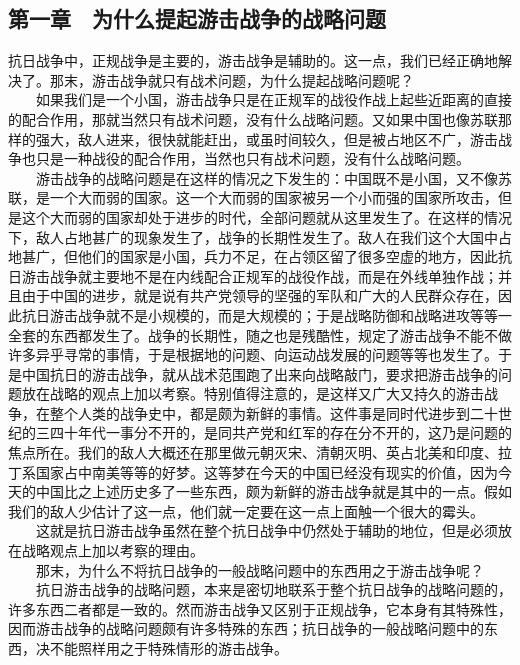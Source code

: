 \documentclass[cn,11pt,chinese]{elegantbook}
\def\myformat#1{\hfil\hfil #1}
\begin{document}
\subsection*{\myformat{第一章　为什么提起游击战争的战略问题}}
抗日战争中，正规战争是主要的，游击战争是辅助的。这一点，我们已经正确地解决了。那末，游击战争就只有战术问题，为什么提起战略问题呢？\\
　　如果我们是一个小国，游击战争只是在正规军的战役作战上起些近距离的直接的配合作用，那就当然只有战术问题，没有什么战略问题。又如果中国也像苏联那样的强大，敌人进来，很快就能赶出，或虽时间较久，但是被占地区不广，游击战争也只是一种战役的配合作用，当然也只有战术问题，没有什么战略问题。\\
　　游击战争的战略问题是在这样的情况之下发生的：中国既不是小国，又不像苏联，是一个大而弱的国家。这一个大而弱的国家被另一个小而强的国家所攻击，但是这个大而弱的国家却处于进步的时代，全部问题就从这里发生了。在这样的情况下，敌人占地甚广的现象发生了，战争的长期性发生了。敌人在我们这个大国中占地甚广，但他们的国家是小国，兵力不足，在占领区留了很多空虚的地方，因此抗日游击战争就主要地不是在内线配合正规军的战役作战，而是在外线单独作战；并且由于中国的进步，就是说有共产党领导的坚强的军队和广大的人民群众存在，因此抗日游击战争就不是小规模的，而是大规模的；于是战略防御和战略进攻等等一全套的东西都发生了。战争的长期性，随之也是残酷性，规定了游击战争不能不做许多异乎寻常的事情，于是根据地的问题、向运动战发展的问题等等也发生了。于是中国抗日的游击战争，就从战术范围跑了出来向战略敲门，要求把游击战争的问题放在战略的观点上加以考察。特别值得注意的，是这样又广大又持久的游击战争，在整个人类的战争史中，都是颇为新鲜的事情。这件事是同时代进步到二十世纪的三四十年代一事分不开的，是同共产党和红军的存在分不开的，这乃是问题的焦点所在。我们的敌人大概还在那里做元朝灭宋、清朝灭明、英占北美和印度、拉丁系国家占中南美等等的好梦。这等梦在今天的中国已经没有现实的价值，因为今天的中国比之上述历史多了一些东西，颇为新鲜的游击战争就是其中的一点。假如我们的敌人少估计了这一点，他们就一定要在这一点上面触一个很大的霉头。\\
　　这就是抗日游击战争虽然在整个抗日战争中仍然处于辅助的地位，但是必须放在战略观点上加以考察的理由。\\
　　那末，为什么不将抗日战争的一般战略问题中的东西用之于游击战争呢？\\
　　抗日游击战争的战略问题，本来是密切地联系于整个抗日战争的战略问题的，许多东西二者都是一致的。然而游击战争又区别于正规战争，它本身有其特殊性，因而游击战争的战略问题颇有许多特殊的东西；抗日战争的一般战略问题中的东西，决不能照样用之于特殊情形的游击战争。\\
\end{document}
